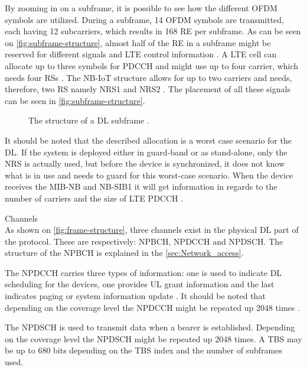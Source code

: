 By zooming in on a subframe, it is possible to see how the different \gls{OFDM} symbols are utilized. During a subframe, 14 \gls{OFDM} symbols are transmitted, each having 12 subcarriers, which results in 168 \gls{RE} per subframe. As can be seen on \autoref{fig:subframe-structure}, almost half of the \gls{RE} in a subframe might be reserved for different signals and \gls{LTE} control information \citep{REL-13}. A \gls{LTE} cell can allocate up to three symbols for \gls{PDCCH} and might use up to four carrier, which needs four \gls{RS}s \citep{whitepaper}. The \gls{NB-IoT} structure allows for up to two carriers and needs, therefore, two \gls{RS} namely \gls{NRS}1 and \gls{NRS}2 \citep{REL-13}. The placement of all these signals can be seen in \autoref{fig:subframe-structure}.  

\begin{figure}[H]
\centering

\caption{The structure of a \gls{DL} subframe \citep{whitepaper,REL-13}.}
\label{fig:subframe-structure}
\end{figure}

It should be noted that the described allocation is a worst case scenario for the \gls{DL}. If the system is deployed either in guard-band or as stand-alone, only the \gls{NRS} is actually used, but before the device is synchronized, it does not know what is in use and needs to guard for this worst-case scenario. When the device receives the \gls{MIB-NB} and \gls{NB-SIB}1 it will get information in regards to the number of carriers and the size of \gls{LTE} \gls{PDCCH} \citep{whitepaper}. 

Channels\\ 
As shown on \autoref{fig:frame-structure}, three channels exist in the physical \gls{DL} part of the protocol. These are respectively: \gls{NPBCH}, \gls{NPDCCH} and \gls{NPDSCH}. The structure of the \gls{NPBCH} is explained in the \autoref{sec:Network_access}.

The \gls{NPDCCH} carries three types of information: one is used to indicate \gls{DL} scheduling for the devices, one provides \gls{UL} grant information and the last indicates paging or system information update \citep{NB-IoT_Book}. It should be noted that depending on the coverage level the \gls{NPDCCH} might be repeated up 2048 times \citep{NB-IoT_Book}.

The \gls{NPDSCH} is used to transmit data when a bearer is established. Depending on the coverage level the \gls{NPDSCH} might be repeated up 2048 times. A \gls{TBS} may be up to 680 bits depending on the \gls{TBS} index and the number of subframes used. \citep{NB-IoT_Book}

